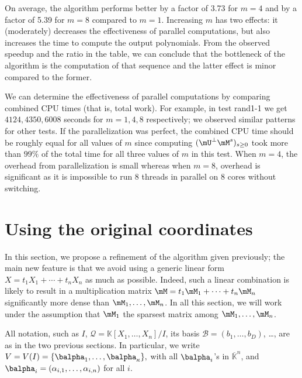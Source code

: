 \documentclass[12pt]{article}
\newcommand{\basis}{\mathscr{B}}
\newcommand{\lf}{X}
\newcommand{\residueI}{\mathscr{Q}}
\def\dg{\kappa}
\def\K{\mathbb{K}}
\def\K {\ensuremath{\mathbb{K}}}
\def\Kbar {{\ensuremath{\overline{\mathbb{K}}}}}
\begin{document}
On average, the algorithm performs better by a factor of 3.73 for
$m=4$ and by a factor of 5.39 for $m=8$ compared to $m=1$. Increasing
$m$ has two effects: it (moderately) decreases the effectiveness of
parallel computations, but also increases the time to compute the
output polynomials. From the observed speedup and the ratio in the
table, we can conclude that the bottleneck of the algorithm is
the computation of that sequence and the latter effect is minor
compared to the former.

We can determine the effectiveness of parallel computations by
comparing combined CPU times (that is, total work).  For example, in
test rand1-1 we get $4124, 4350, 6008$ seconds for $m=1,4,8$
respectively; we observed similar patterns for other tests. If the
parallelization was perfect, the combined CPU time should be roughly
equal for all values of $m$ since computing $(\mU^{\perp}
\mM^s)_{s\ge0}$ took more than $99\%$ of the total time for all three
values of $m$ in this test. When $m=4$, the overhead from
parallelization is small whereas when $m=8$, overhead is significant
as it is impossible to run 8 threads in parallel on 8 cores without
switching.


\section{Using the original coordinates}\label{sec:original}

In this section, we propose a refinement of the algorithm given
previously; the main new feature is that we avoid using a generic
linear form $\lf = t_1 X_1 + \cdots + t_n X_n$ as much as possible.
Indeed, such a linear combination is likely to result in a
multiplication matrix $\mM = t_1 \mM_1 + \cdots + t_n \mM_n$
significantly more dense than $\mM_1,\dots,\mM_n$. In all this
section, we will work under the assumption that $\mM_1$ the sparsest
matrix among $\mM_1,\dots,\mM_n$.

All notation, such as $I$, $\residueI=\K[X_1,\dots,X_n]/I$, its basis
$\basis=(b_1,\dots,b_D)$, \dots, are as in the two previous sections.
In particular, we write $V=V(I)=\{\balpha_1,\dots,\balpha_\dg\},$ with
all $\balpha_i$'s in $\Kbar^n$, and
$\balpha_i=(\alpha_{i,1},\dots,\alpha_{i,n})$ for all $i$.

\end{document}
